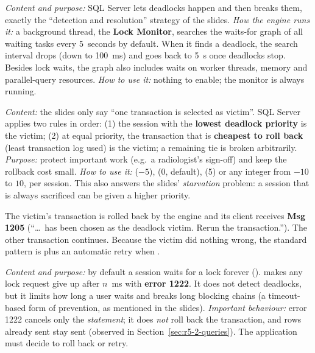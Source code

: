 \emph{Content and purpose:} SQL Server lets deadlocks happen and then breaks them, exactly the ``detection and resolution'' strategy of the slides. \emph{How the engine runs it:} a background thread, the \textbf{Lock Monitor}, searches the waits-for graph of all waiting tasks every 5~seconds by default. When it finds a deadlock, the search interval drops (down to 100~ms) and goes back to 5~s once deadlocks stop. Besides lock waits, the graph also includes waits on worker threads, memory and parallel-query resources. \emph{How to use it:} nothing to enable; the monitor is always running.

\emph{Content:} the slides only say ``one transaction is selected as victim''. SQL Server applies two rules in order: (1) the session with the \textbf{lowest deadlock priority} is the victim; (2) at equal priority, the transaction that is \textbf{cheapest to roll back} (least transaction log used) is the victim; a remaining tie is broken arbitrarily. \emph{Purpose:} protect important work (e.g.\ a radiologist's sign-off) and keep the rollback cost small. \emph{How to use it:}  ($-5$),  (0, default),  (5) or any integer from $-10$ to $10$, per session. This also answers the slides' \emph{starvation} problem: a session that is always sacrificed can be given a higher priority.

The victim's transaction is rolled back by the engine and its client receives \textbf{Msg 1205} (``\dots\ has been chosen as the deadlock victim. Rerun the transaction.''). The other transaction continues. Because the victim did nothing wrong, the standard pattern is  plus an automatic retry when .

\emph{Content and purpose:} by default a session waits for a lock forever ().  makes any lock request give up after $n$~ms with \textbf{error 1222}. It does not detect deadlocks, but it limits how long a user waits and breaks long blocking chains (a timeout-based form of prevention, as mentioned in the slides). \emph{Important behaviour:} error 1222 cancels only the \emph{statement}; it does \emph{not} roll back the transaction, and rows already sent stay sent (observed in Section~\ref{sec:r5-2-queries}). The application must decide to roll back or retry.


